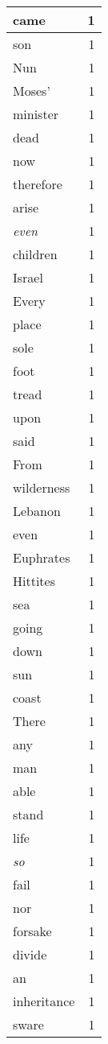 \begin{center}
\begin{longtable}{l|r}
came & 1 \\ \hline
son & 1 \\ \hline
Nun & 1 \\ \hline
Moses' & 1 \\ \hline
minister & 1 \\ \hline
dead & 1 \\ \hline
now & 1 \\ \hline
therefore & 1 \\ \hline
arise & 1 \\ \hline
\emph{even} & 1 \\ \hline
children & 1 \\ \hline
Israel & 1 \\ \hline
Every & 1 \\ \hline
place & 1 \\ \hline
sole & 1 \\ \hline
foot & 1 \\ \hline
tread & 1 \\ \hline
upon & 1 \\ \hline
said & 1 \\ \hline
From & 1 \\ \hline
wilderness & 1 \\ \hline
Lebanon & 1 \\ \hline
even & 1 \\ \hline
Euphrates & 1 \\ \hline
Hittites & 1 \\ \hline
sea & 1 \\ \hline
going & 1 \\ \hline
down & 1 \\ \hline
sun & 1 \\ \hline
coast & 1 \\ \hline
There & 1 \\ \hline
any & 1 \\ \hline
man & 1 \\ \hline
able & 1 \\ \hline
stand & 1 \\ \hline
life & 1 \\ \hline
\emph{so} & 1 \\ \hline
fail & 1 \\ \hline
nor & 1 \\ \hline
forsake & 1 \\ \hline
divide & 1 \\ \hline
an & 1 \\ \hline
inheritance & 1 \\ \hline
sware & 1 \\ \hline

\end{longtable}
\end{center}
